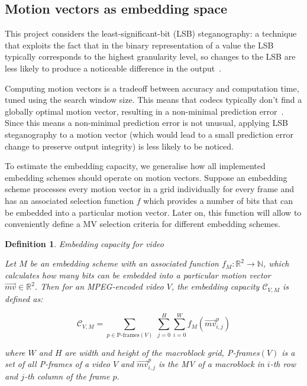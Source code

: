 \documentclass[12pt,british,twoside,notitlepage,usenames,dvipsnames,hypens,final]{report}
\newtheorem{definition}{Definition}
\numberwithin{equation}{section}
\numberwithin{figure}{section}
\begin{document}
\subsection{Motion vectors as embedding space}
\label{mv-emb-space}

This project considers the least-significant-bit (LSB) steganography: a technique that exploits the fact that in the binary representation of a value the LSB typically corresponds to the highest granularity level, so changes to the LSB are less likely to produce a noticeable difference in the output~\cite{bateman}.

Computing motion vectors is a tradeoff between accuracy and computation time, tuned using the search window size. This means that codecs typically don't find a globally optimal motion vector, resulting in a non-minimal prediction error~\cite[p.~257]{richardson2004h}. Since this means a non-minimal prediction error is not unusual, applying LSB steganography to a motion vector (which would lead to a small prediction error change to preserve output integrity) is less likely to be noticed.

To estimate the embedding capacity, we generalise how all implemented embedding schemes should operate on motion vectors. Suppose an embedding scheme processes every motion vector in a grid individually for every frame and has an associated selection function $f$ which provides a number of bits that can be embedded into a particular motion vector. Later on, this function will allow to conveniently define a MV selection criteria for different embedding schemes.

\begin{definition}{Embedding capacity for video}

Let $M$ be an embedding scheme with an associated function $f_M : \mathbb{R}^2 \rightarrow \mathbb{N}$, which calculates how many bits can be embedded into a particular motion vector $\overrightarrow{mv} \in \mathbb{R}^2$. Then for an MPEG-encoded video $V$, the embedding capacity $\mathcal{C}_{V, M}$ is defined as:

$$ \mathcal{C}_{V, M} = \sum_{p \in \text{P-frames}(V)} \: \sum^{H}_{j = 0} \sum^{W}_{i = 0} f_M(\overrightarrow{mv}^p_{i, j})$$

where $W$ and $H$ are width and height of the macroblock grid, P-frames$(V)$ is a set of all P-frames of a video $V$ and $\overrightarrow{mv}^p_{i, j}$ is the MV of a macroblock  in $i$-th row and $j$-th column of the frame $p$.

\end{definition}
\end{document}
